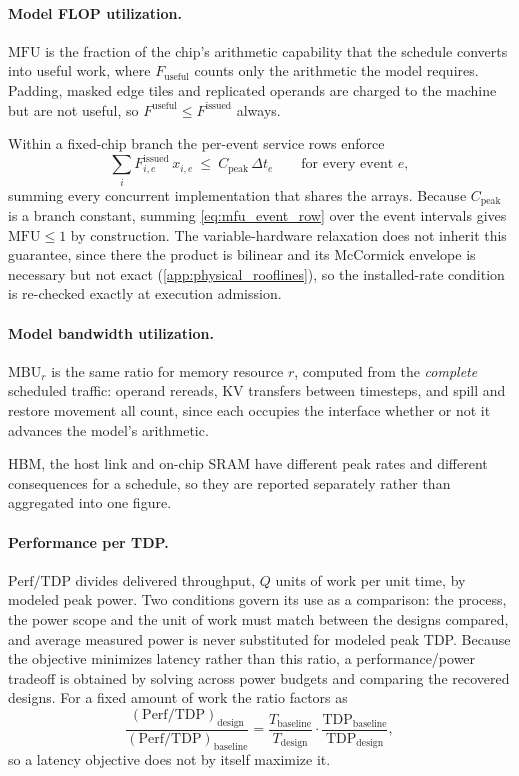 \paragraph{Model FLOP utilization.}
$\mathrm{MFU}$ is the fraction of the chip's arithmetic capability that the schedule converts into useful work, where $F_{\mathrm{useful}}$ counts only the arithmetic the model requires.
Padding, masked edge tiles and replicated operands are charged to the machine but are not useful, so $F^{\mathrm{useful}}\le F^{\mathrm{issued}}$ always.

Within a fixed-chip branch the per-event service rows enforce
\begin{equation}
\sum_i F^{\mathrm{issued}}_{i,e}\,x_{i,e}\ \le\ C_{\mathrm{peak}}\,\Delta t_e
\qquad\text{for every event } e,
\label{eq:mfu_event_row}
\end{equation}
summing every concurrent implementation that shares the arrays.
Because $C_{\mathrm{peak}}$ is a branch constant, summing \eqref{eq:mfu_event_row} over the event intervals gives $\mathrm{MFU}\le1$ by construction.
The variable-hardware relaxation does not inherit this guarantee, since there the product is bilinear and its McCormick envelope is necessary but not exact (\cref{app:physical_rooflines}), so the installed-rate condition is re-checked exactly at execution admission.

\paragraph{Model bandwidth utilization.}
$\mathrm{MBU}_r$ is the same ratio for memory resource $r$, computed from the \emph{complete} scheduled traffic: operand rereads, KV transfers between timesteps, and spill and restore movement all count, since each occupies the interface whether or not it advances the model's arithmetic.

HBM, the host link and on-chip SRAM have different peak rates and different consequences for a schedule, so they are reported separately rather than aggregated into one figure.

\paragraph{Performance per TDP.}
$\mathrm{Perf}/\mathrm{TDP}$ divides delivered throughput, $Q$ units of work per unit time, by modeled peak power.
Two conditions govern its use as a comparison: the process, the power scope and the unit of work must match between the designs compared, and average measured power is never substituted for modeled peak TDP.
Because the objective minimizes latency rather than this ratio, a performance/power tradeoff is obtained by solving across power budgets and comparing the recovered designs.
For a fixed amount of work the ratio factors as
\begin{equation}
\frac{(\mathrm{Perf}/\mathrm{TDP})_{\mathrm{design}}}{(\mathrm{Perf}/\mathrm{TDP})_{\mathrm{baseline}}}
=\frac{T_{\mathrm{baseline}}}{T_{\mathrm{design}}}\cdot\frac{\mathrm{TDP}_{\mathrm{baseline}}}{\mathrm{TDP}_{\mathrm{design}}},
\label{eq:perf_tdp_factor}
\end{equation}
so a latency objective does not by itself maximize it.

